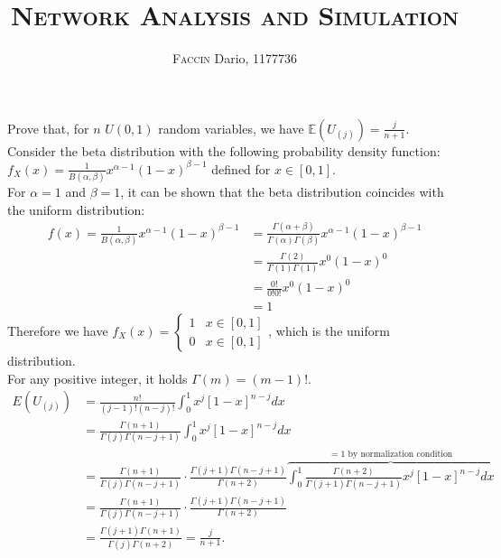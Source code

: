 \documentclass[a4paper, 12pt]{article}
\begin{document}
\author{\textsc{Faccin} Dario, 1177736}
\title{\vspace{-2cm} \textsc{Network Analysis and Simulation}}
\vspace{-8ex}
\date{}
\maketitle

\setlength\parindent{0pt}
Prove that, for $n$ $U(0,1)$ random variables, we have $ \mathbb{E} \left( U_{(j)} \right) = \frac{j}{n+1}$.\\
\bigbreak
Consider the beta distribution with the following probability density function:\\[5pt]
$f_X(x) =\frac{1}{B(\alpha, \beta)} x^{\alpha -1} (1-x)^{\beta-1} $ defined for $x\in [0,1]$.\\[5pt]
For $ \alpha=1$ and $\beta=1$, it can be shown that the beta distribution coincides with the uniform distribution:
\begin{align*}
	f(x) =\frac{1}{B(\alpha, \beta)} x^{\alpha -1} (1-x)^{\beta-1} & = \frac{\Gamma(\alpha + \beta)}{\Gamma(\alpha) \Gamma(\beta)} x^{\alpha -1} (1-x)^{\beta-1}\\[5pt]
	& = \frac{\Gamma(2)}{\Gamma(1) \Gamma(1)} x^{0} (1-x)^{0}\\[5pt]
	& = \frac{0!}{0!0!} x^{0} (1-x)^{0}\\[5pt]
	& = 1
\end{align*}
Therefore we have $f_X (x) =
\begin{cases}
	1 & x\in [0,1]\\[5pt]
	0 & x\in [0,1]
\end{cases}$, which is the uniform distribution.\\[5pt]
For any positive integer, it holds $\Gamma(m) = (m-1)!$.
\begin{align*}
E(U_{(j)}) &=\frac{n!}{(j-1)!(n-j)!}\int_0^1 x^{j}[1-x]^{n-j}dx \\[5pt]
&= \frac{ \Gamma(n+1)}{\Gamma(j) \Gamma(n-j+1)}\int_0^1 x^{j}[1-x]^{n-j}dx \\
&=\frac{ \Gamma(n+1)}{\Gamma(j) \Gamma(n-j+1)} \cdot \frac{\Gamma(j+1) \Gamma(n-j+1) }{ \Gamma(n+2)} \overbrace{\int_0^1 \frac{ \Gamma(n+2)}{\Gamma(j+1) \Gamma(n-j+1) } x^{j}[1-x]^{n-j}dx}^{=1 \text{ by normalization condition}}\\[5pt]
&= \frac{ \Gamma(n+1)}{\Gamma(j) \Gamma(n-j+1)} \cdot \frac{\Gamma(j+1) \Gamma(n-j+1) }{ \Gamma(n+2)} \\[5pt]
&= \frac{\Gamma(j+1) \Gamma(n+1)}{\Gamma(j) \Gamma(n+2)} = \frac{j}{n+1}.
\end{align*}
\end{document}
